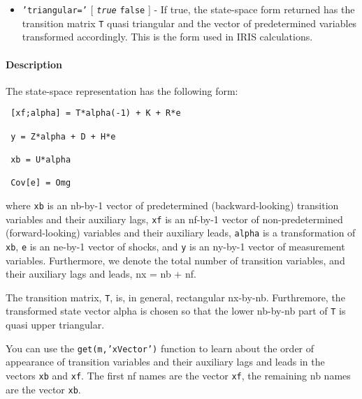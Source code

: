  \begin{itemize}
 \item
   \texttt{'triangular='} {[} \emph{\texttt{true}} \textbar{}
   \texttt{false} {]} - If true, the state-space form returned has the
   transition matrix \texttt{T} quasi triangular and the vector of
   predetermined variables transformed accordingly. This is the form used
   in IRIS calculations.
 \end{itemize}
 
 \paragraph{Description}
 
 The state-space representation has the following form:
 
 \begin{verbatim}
 [xf;alpha] = T*alpha(-1) + K + R*e
 
 y = Z*alpha + D + H*e
 
 xb = U*alpha
 
 Cov[e] = Omg
 \end{verbatim}
 
 where \texttt{xb} is an nb-by-1 vector of predetermined
 (backward-looking) transition variables and their auxiliary lags,
 \texttt{xf} is an nf-by-1 vector of non-predetermined (forward-looking)
 variables and their auxiliary leads, \texttt{alpha} is a transformation
 of \texttt{xb}, \texttt{e} is an ne-by-1 vector of shocks, and
 \texttt{y} is an ny-by-1 vector of measurement variables. Furthermore,
 we denote the total number of transition variables, and their auxiliary
 lags and leads, nx = nb + nf.
 
 The transition matrix, \texttt{T}, is, in general, rectangular nx-by-nb.
 Furthremore, the transformed state vector alpha is chosen so that the
 lower nb-by-nb part of \texttt{T} is quasi upper triangular.
 
 You can use the \texttt{get(m,'xVector')} function to learn about the
 order of appearance of transition variables and their auxiliary lags and
 leads in the vectors \texttt{xb} and \texttt{xf}. The first nf names are
 the vector \texttt{xf}, the remaining nb names are the vector
 \texttt{xb}.


